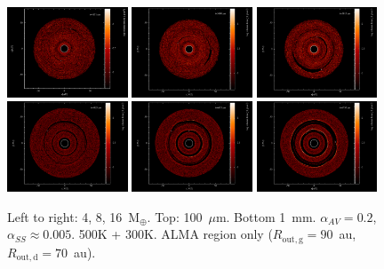 \documentclass[usenatbib,a4paper,times,fleqn]{mnras}
\renewcommand{\earth}{\mathrm{M}_{\oplus}}
\begin{document}
\begin{figure}
   \begin{center}
      \includegraphics[width=0.32\textwidth]{figs/4-100mu-dust.pdf}
      \includegraphics[width=0.32\textwidth]{figs/8-100mu-dust.pdf}
      \includegraphics[width=0.32\textwidth]{figs/16-100mu-dust.pdf}
      \includegraphics[width=0.32\textwidth]{figs/4-1mm-dust.pdf}
      \includegraphics[width=0.32\textwidth]{figs/8-1mm-dust.pdf}
      \includegraphics[width=0.32\textwidth]{figs/16-1mm-dust.pdf}
      \caption{Left to right: 4, 8, 16~$\earth{}$. Top: 100~$\mu$m. Bottom
      1~mm. $\alpha_{AV}=0.2$, $\alpha_{SS}\approx0.005$. 500K + 300K. ALMA
      region only ($R_{\mathrm{out,g}} = 90$~au, $R_{\mathrm{out,d}} = 70$~au).}
      \label{fig:planet-mass-comparison}
   \end{center}
\end{figure}
\end{document}
